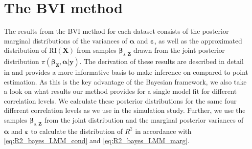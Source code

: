 \section{The BVI method}
The results from the BVI method for each dataset consists of the posterior marginal distributions of the variances of $\boldsymbol{\alpha}$ and $\boldsymbol{\varepsilon}$, as well as the approximated distribution of $\text{RI}(\mathbf{X})$ from samples $\boldsymbol{\beta}_{s, \mathbf{Z}}$ drawn from the joint posterior distribution $\pi(\boldsymbol{\beta}_{\mathbf{Z}}, \boldsymbol{\alpha} \lvert \mathbf{y})$.
The derivation of these results are described in detail in  and provides a more informative basis to make inference on compared to point estimation.
As this is the key advantage of the Bayesian framework, we also take a look on what results our method provides for a single model fit for different correlation levels. 
We calculate these posterior distributions for the same four different correlation levels as we use in the simulation study.
Further, we use the samples $\boldsymbol{\beta}_{s, \mathbf{Z}}$ from the joint distribution and the marginal posterior variances of $\boldsymbol{\alpha}$ and $\boldsymbol{\varepsilon}$ to calculate the distribution of $R^2$ in accordance with \eqref{eq:R2_bayes_LMM_cond} and \eqref{eq:R2_bayes_LMM_marg}. 


